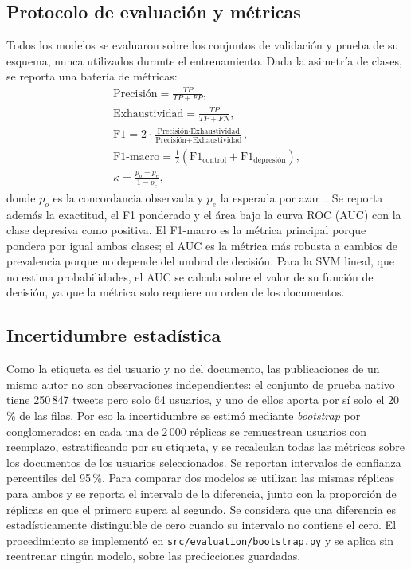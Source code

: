 \documentclass[12pt,a4paper]{article}
\begin{document}
\subsection{Protocolo de evaluación y métricas}
\label{sec:protocolo}
Todos los modelos se evaluaron sobre los conjuntos de validación y prueba de su esquema, nunca utilizados durante el entrenamiento. Dada la asimetría de clases, se reporta una batería de métricas:
\begin{gather}
\text{Precisión} = \frac{TP}{TP + FP}, \\
\text{Exhaustividad} = \frac{TP}{TP + FN}, \\
\text{F1} = 2 \cdot \frac{\text{Precisión} \cdot \text{Exhaustividad}}{\text{Precisión} + \text{Exhaustividad}}, \\
\text{F1-macro} = \tfrac{1}{2}\left(\text{F1}_{\text{control}} + \text{F1}_{\text{depresión}}\right), \\
\kappa = \frac{p_o - p_e}{1 - p_e},
\end{gather}
donde $p_o$ es la concordancia observada y $p_e$ la esperada por azar~\cite{cohen1960kappa}. Se reporta además la exactitud, el F1 ponderado y el área bajo la curva ROC (AUC) con la clase depresiva como positiva. El F1-macro es la métrica principal porque pondera por igual ambas clases; el AUC es la métrica más robusta a cambios de prevalencia porque no depende del umbral de decisión. Para la SVM lineal, que no estima probabilidades, el AUC se calcula sobre el valor de su función de decisión, ya que la métrica solo requiere un orden de los documentos.

\subsection{Incertidumbre estadística}
\label{sec:incertidumbre}
Como la etiqueta es del usuario y no del documento, las publicaciones de un mismo autor no son observaciones independientes: el conjunto de prueba nativo tiene 250\,847 tweets pero solo 64 usuarios, y uno de ellos aporta por sí solo el 20\,\% de las filas. Por eso la incertidumbre se estimó mediante \emph{bootstrap} por conglomerados: en cada una de 2\,000 réplicas se remuestrean usuarios con reemplazo, estratificando por su etiqueta, y se recalculan todas las métricas sobre los documentos de los usuarios seleccionados. Se reportan intervalos de confianza percentiles del 95\,\%. Para comparar dos modelos se utilizan las mismas réplicas para ambos y se reporta el intervalo de la diferencia, junto con la proporción de réplicas en que el primero supera al segundo. Se considera que una diferencia es estadísticamente distinguible de cero cuando su intervalo no contiene el cero. El procedimiento se implementó en \texttt{src/evaluation/bootstrap.py} y se aplica sin reentrenar ningún modelo, sobre las predicciones guardadas.
\end{document}
